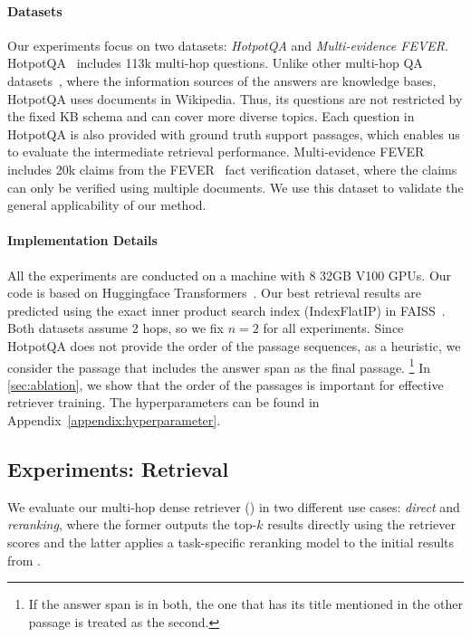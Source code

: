 \paragraph{Datasets} 
Our experiments focus on two datasets: \emph{HotpotQA} and \emph{Multi-evidence FEVER}.
HotpotQA~\citep{HotpotQA} includes 113k multi-hop questions.
Unlike other multi-hop QA datasets~\citep{MetaQA,ComplexWebQ,Wikihop}, where the information sources of the answers are knowledge bases, 
HotpotQA uses documents in Wikipedia. Thus, its questions are not restricted by the fixed KB schema and can cover more diverse topics. Each question in HotpotQA is also provided with ground truth support passages, which enables us to evaluate the intermediate retrieval performance.
Multi-evidence FEVER includes 20k claims from the FEVER~\citep{FEVER} fact verification dataset, where the claims can only be verified using multiple documents. 
We use this dataset to validate the general applicability of our method.

\paragraph{Implementation Details} 
All the experiments are conducted on a machine with 8 32GB V100 GPUs. Our code is based on Huggingface Transformers~\citep{wolf2019huggingface}. Our best retrieval results are predicted using the exact inner product search index (IndexFlatIP) in FAISS~\citep{FAISS}. Both datasets assume 2 hops, so we fix $n=2$ for all experiments. Since HotpotQA does not provide the order of the passage sequences, as a heuristic, we consider the passage that includes the answer span as the final passage.
\footnote{If the answer span is in both, the one that has its title mentioned in the other passage is treated as the second.}
In \cref{sec:ablation}, we show that the order of the passages is important for effective retriever training. The hyperparameters can be found in Appendix~\ref{appendix:hyperparameter}. 

\subsection{Experiments: Retrieval}
\label{sec:exp}

We evaluate our multi-hop dense retriever (\method) in two different use cases: \emph{direct} and \emph{reranking}, where the former outputs the top-$k$ results directly using the retriever scores and the latter applies a task-specific reranking model to the initial results from \method.


